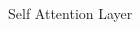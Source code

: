 \begin{frame}{Self Attention Layer}
\begin{columns}
\begin{column}{0.5\textwidth}
    \end{column}
\end{columns}
\end{frame}